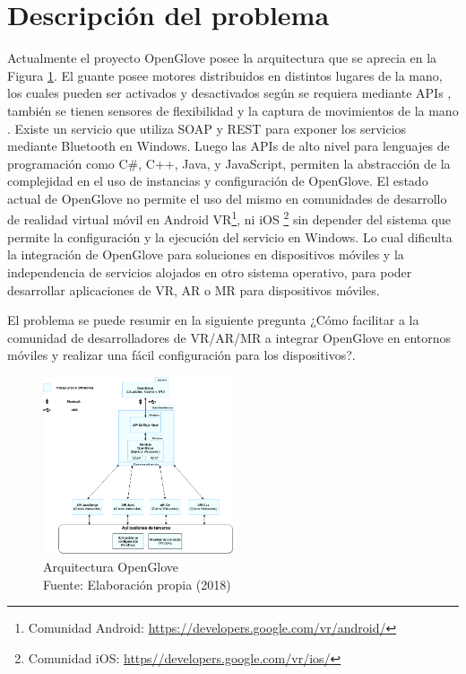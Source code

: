 \section{Descripción del problema}
\label{seccion:descripcion-problema}

  Actualmente el proyecto OpenGlove posee la  arquitectura que se aprecia en la Figura \ref{fig:arquitectura-open-glove}. El guante posee motores distribuidos en distintos lugares de la mano, los cuales pueden ser activados y desactivados según se requiera mediante APIs \citep{tesis-monsalve-rodrigo}, también se tienen sensores de flexibilidad y la captura de movimientos de la mano \citep{tesis-cerda-rodrigo} . Existe un servicio que utiliza SOAP y REST para exponer los servicios mediante Bluetooth en Windows. Luego las  APIs de alto nivel \citep{tesis-meneses-sebastian} para lenguajes de programación como C\#, C++, Java, y JavaScript, permiten la abstracción de  la complejidad en el uso de instancias y configuración de OpenGlove. El estado actual de OpenGlove no permite el uso del mismo en comunidades de desarrollo de realidad virtual móvil en Android VR\footnote{Comunidad Android: \url{https://developers.google.com/vr/android/}}, ni iOS \footnote{Comunidad iOS: \url{https//developers.google.com/vr/ios/}} sin depender del sistema que permite la configuración y la ejecución del servicio en Windows. Lo cual dificulta la integración de OpenGlove para soluciones en dispositivos móviles y la independencia de servicios alojados en otro sistema operativo,  para poder desarrollar aplicaciones de VR, AR o MR para dispositivos móviles.
  
El problema se puede resumir en la siguiente pregunta  ¿Cómo facilitar a la comunidad de desarrolladores de VR/AR/MR a integrar OpenGlove en entornos móviles y realizar una fácil configuración para los dispositivos?.
  
  \begin{figure}[H]
  \begin{center} 
   	\includegraphics[width=0.5\textwidth]{images/chapter01/Legacy-OpenGlove-Architecture.png} 
    \caption[Arquitectura OpenGlove]{Arquitectura OpenGlove \\Fuente: Elaboración propia (2018)}
    \label{fig:arquitectura-open-glove}
  \end{center}
\end{figure}

